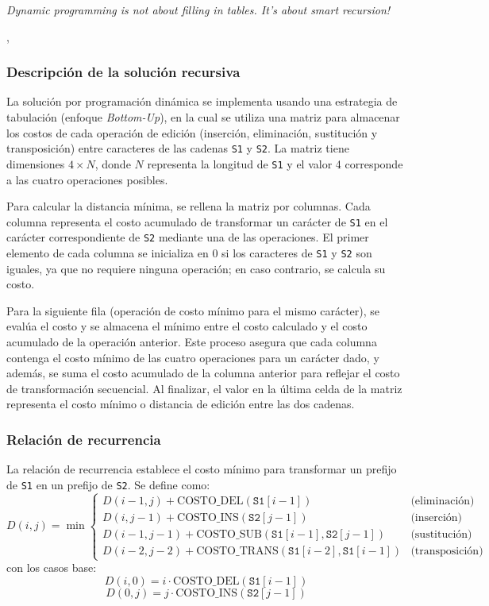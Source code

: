 \epigraph{\textit{Dynamic programming is not about filling in tables. It's about smart recursion!}}{\citeauthor{algorithms_erickson}, \citeyear{algorithms_erickson} \cite{algorithms_erickson}}


\subsubsection{Descripción de la solución recursiva}

La solución por programación dinámica se implementa usando una estrategia de tabulación (enfoque \textit{Bottom-Up}), en la cual se utiliza una matriz para almacenar los costos de cada operación de edición (inserción, eliminación, sustitución y transposición) entre caracteres de las cadenas \texttt{S1} y \texttt{S2}. La matriz tiene dimensiones \( 4 \times N \), donde \( N \) representa la longitud de \texttt{S1} y el valor 4 corresponde a las cuatro operaciones posibles.

Para calcular la distancia mínima, se rellena la matriz por columnas. Cada columna representa el costo acumulado de transformar un carácter de \texttt{S1} en el carácter correspondiente de \texttt{S2} mediante una de las operaciones. El primer elemento de cada columna se inicializa en 0 si los caracteres de \texttt{S1} y \texttt{S2} son iguales, ya que no requiere ninguna operación; en caso contrario, se calcula su costo.

Para la siguiente fila (operación de costo mínimo para el mismo carácter), se evalúa el costo y se almacena el mínimo entre el costo calculado y el costo acumulado de la operación anterior. Este proceso asegura que cada columna contenga el costo mínimo de las cuatro operaciones para un carácter dado, y además, se suma el costo acumulado de la columna anterior para reflejar el costo de transformación secuencial. Al finalizar, el valor en la última celda de la matriz representa el costo mínimo o distancia de edición entre las dos cadenas.

\subsubsection{Relación de recurrencia}

La relación de recurrencia establece el costo mínimo para transformar un prefijo de \texttt{S1} en un prefijo de \texttt{S2}. Se define como:
\[
D(i, j) = \min \begin{cases} 
      D(i-1, j) + \text{COSTO\_DEL}(\texttt{S1}[i-1]) & \text{(eliminación)} \\
      D(i, j-1) + \text{COSTO\_INS}(\texttt{S2}[j-1]) & \text{(inserción)} \\
      D(i-1, j-1) + \text{COSTO\_SUB}(\texttt{S1}[i-1], \texttt{S2}[j-1]) & \text{(sustitución)} \\
      D(i-2, j-2) + \text{COSTO\_TRANS}(\texttt{S1}[i-2], \texttt{S1}[i-1]) & \text{(transposición)}
   \end{cases}
\]
con los casos base:
\[
D(i, 0) = i \cdot \text{COSTO\_DEL}(\texttt{S1}[i-1])
\]
\[
D(0, j) = j \cdot \text{COSTO\_INS}(\texttt{S2}[j-1])
\]
\\
